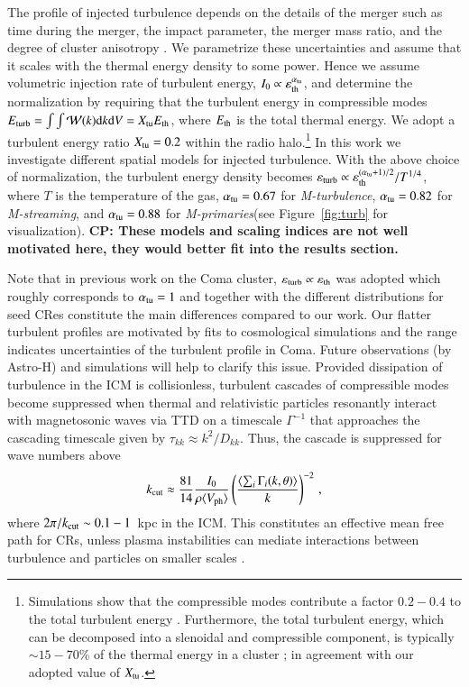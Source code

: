 \documentclass[fleqn,usenatbib,useAMS]{mnras}
\newcommand{\Mstream}{{\it M-streaming}\xspace}
\newcommand{\Mflatturb}{{\it M-turbulence}\xspace}
\newcommand{\Mprimary}{{\it M-primaries}\xspace}
\newcommand{\Vph}{V_\mathrm{ph}}
\newcommand{\eps}{\varepsilon}
\def\CP#1{{\bf {\color{mygreen} CP: #1}}}
\begin{document}
The profile of injected turbulence depends on the details of the
merger such as time during the merger, the impact parameter, the
merger mass ratio, and the degree of cluster anisotropy
\citep{2015ApJ...800...60M}. We parametrize these uncertainties and
assume that it scales with the thermal energy density to some
power. Hence we assume volumetric injection rate of turbulent energy,
$I_0\propto \eps_\rmn{th}^{\alpha_\rmn{tu}}$, and determine the
normalization by requiring that the turbulent energy in compressible
modes $E_{\mathrm{turb}}=\int \int \mathcal{W}(k) {\mathrm{d}}k {\mathrm{d}}V =
X_{\mathrm{tu}} E_{\mathrm{th}}$, where $E_{\mathrm{th}}$ is the total thermal
energy. We adopt a turbulent energy ratio $X_{\mathrm{tu}}=0.2$ within the
radio halo.\footnote{Simulations show that the compressible modes
  contribute a factor $0.2-0.4$ to the total turbulent energy
  \citep{2013ApJ...771..131B,2015ApJ...800...60M}. Furthermore, the
  total turbulent energy, which can be decomposed into a slenoidal and
  compressible component, is typically $\sim15-70$\% of the thermal
  energy in a cluster \citep{2011A&A...529A..17V}; in agreement with
  our adopted value of $X_{\mathrm{tu}}$.} In this work we investigate
different spatial models for injected turbulence. With the above
choice of normalization, the turbulent energy density becomes
$\eps_\rmn{turb} \propto
\eps_\rmn{th}^{(\alpha_\rmn{tu}+1)/2}/T^{1/4}$, where $T$ is the
temperature of the gas, $\alpha_{\mathrm{tu}}= 0.67$ for \Mflatturb,
$\alpha_{\mathrm{tu}}= 0.82$ for \Mstream, and $\alpha_{\mathrm{tu}}= 0.88$ for
\Mprimary (see Figure~\ref{fig:turb} for visualization). \CP{These
  models and scaling indices are not well motivated here, they would
  better fit into the results section.}

Note that in previous work on the Coma cluster, $\eps_\rmn{turb}
\propto \eps_\rmn{th}$ was adopted which roughly corresponds to
$\alpha_{\mathrm{tu}}= 1$ \citep{brunetti12} and together with the
different distributions for seed CRes constitute the main differences
compared to our work. Our flatter turbulent profiles are motivated by
fits to cosmological simulations
\citep{2009ApJ...705.1129L,2010ApJ...725.1452S,2011A&A...529A..17V,2012ApJ...758...74B}
and the range indicates uncertainties of the turbulent profile in
Coma. Future observations (by Astro-H) and simulations will help to
clarify this issue. Provided dissipation of turbulence in the ICM is
collisionless, turbulent cascades of compressible modes become
suppressed when thermal and relativistic particles resonantly interact
with magnetosonic waves via TTD on a timescale $\Gamma^{-1}$ that
approaches the cascading timescale given by $\tau_{kk} \approx
k^2/D_{kk}$. Thus, the cascade is suppressed for wave numbers above
\begin{equation}
\label{eq:kc}
  k_\rmn{cut} \approx \frac{81}{14} \frac{I_0}{\rho \langle \Vph \rangle}
  \left(\frac{\langle\sum_i \Gamma_i(k,\theta)\rangle}{k}\right)^{-2}\,,
\end{equation}
where $2\pi/k_{\mathrm{cut}}\sim 0.1-1$~kpc in the ICM. This constitutes an
effective mean free path for CRs, unless plasma instabilities can
mediate interactions between turbulence and particles on smaller
scales \citep{brunetti11}.
\end{document}
